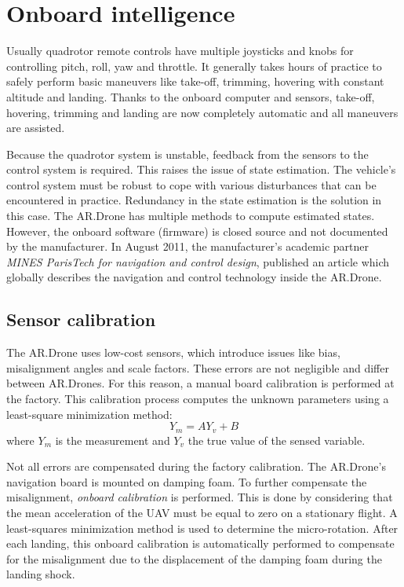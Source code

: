 \section{Onboard intelligence}
\label{sec:platform_onboard_intelligence}
Usually quadrotor remote controls have multiple joysticks and knobs for controlling pitch, roll, yaw and throttle.
It generally takes hours of practice to safely perform basic maneuvers like take-off, trimming, hovering with constant altitude and landing.
Thanks to the onboard computer and sensors, take-off, hovering, trimming and landing are now completely automatic and all maneuvers are assisted.

Because the quadrotor system is unstable, feedback from the sensors to the control system is required.
This raises the issue of state estimation.
The vehicle's control system must be robust to cope with various disturbances that can be encountered in practice.
Redundancy in the state estimation is the solution in this case.
The AR.Drone has multiple methods to compute estimated states.
However, the onboard software (firmware) is closed source and not documented by the manufacturer.
In August 2011, the manufacturer's academic partner \textit{MINES ParisTech for navigation and control design}, published an article \cite{bristeau2011navigation} which globally describes the navigation and control technology inside the AR.Drone.



\subsection{Sensor calibration}
The AR.Drone uses low-cost sensors, which introduce issues like bias, misalignment angles and scale factors.
These errors are not negligible and differ between AR.Drones.
For this reason, a manual board calibration is performed at the factory.
This calibration process computes the unknown parameters using a least-square minimization method:
\begin{equation}
Y_m = AY_v + B
\end{equation}
where $Y_m$ is the measurement and $Y_v$ the true value of the sensed variable.

Not all errors are compensated during the factory calibration.
The AR.Drone's navigation board is mounted on damping foam.
To further compensate the misalignment, \textit{onboard calibration} is performed.
This is done by considering that the mean acceleration of the UAV must be equal to zero on a stationary flight.
A least-squares minimization method is used to determine the micro-rotation.
After each landing, this onboard calibration is automatically performed to compensate for the misalignment due to the displacement of the damping foam during the landing shock.

